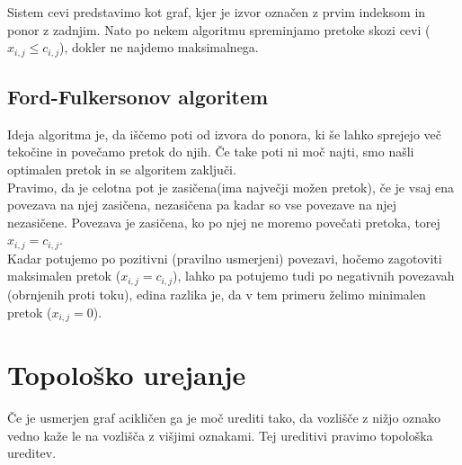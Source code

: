 \documentclass[10pt,a4paper,oneside]{book}
\begin{document}
Sistem cevi predstavimo kot graf, kjer je izvor označen z prvim indeksom in ponor z zadnjim. Nato po nekem algoritmu spreminjamo pretoke skozi cevi ($x_{i,j} \le c_{i,j}$), dokler ne najdemo maksimalnega.

\subsection{Ford-Fulkersonov algoritem}
Ideja algoritma je, da iščemo poti od izvora do ponora, ki še lahko sprejejo več tekočine in povečamo pretok do njih. Če take poti ni moč najti, smo našli optimalen pretok in se algoritem zaključi.\\
Pravimo, da je celotna pot je zasičena(ima največji možen pretok), če je vsaj ena povezava na njej zasičena, nezasičena pa kadar so vse povezave na njej nezasičene. Povezava je zasičena, ko po njej ne moremo povečati pretoka, torej $x_{i,j}=c_{i,j}$.\\

Kadar potujemo po pozitivni (pravilno usmerjeni) povezavi, hočemo zagotoviti maksimalen pretok ($x_{i,j} = c_{i,j}$), lahko pa potujemo tudi po negativnih povezavah (obrnjenih proti toku), edina razlika je, da v tem primeru želimo minimalen pretok ($x_{i,j} = 0$).


\section{Topološko urejanje}
Če je usmerjen graf acikličen ga je moč urediti tako, da vozlišče z nižjo oznako vedno kaže le na vozlišča z višjimi oznakami. Tej ureditivi pravimo topološka ureditev. 

\end{document}
